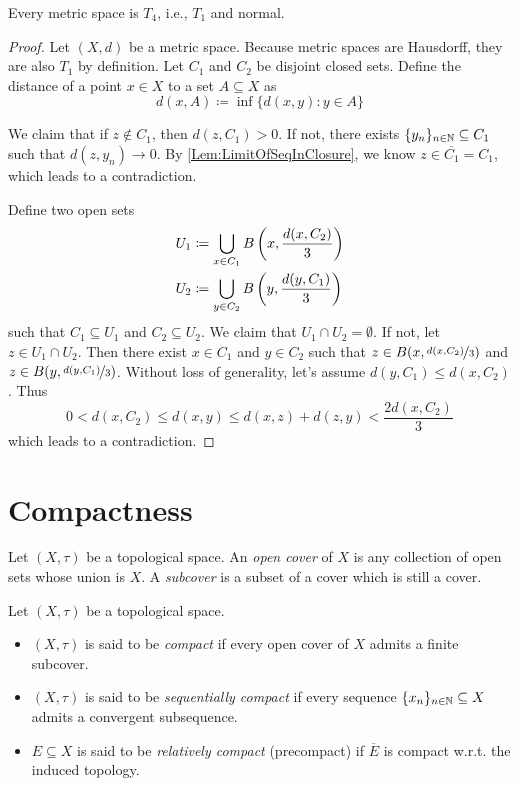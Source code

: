 \documentclass[screen]{techreport}
\numberwithin{equation}{section}
\begin{document}
\begin{proposition}\label{Prop:MetricT4}
	Every metric space is $T_4$, i.e., $T_1$ and normal.
\end{proposition}
\begin{proof}
	Let $(X,d)$ be a metric space.
	Because metric spaces are Hausdorff, they are also $T_1$ by definition.
	Let $C_1$ and $C_2$ be disjoint closed sets.
	Define the distance of a point $x \in X$ to a set $A \subseteq X$ as
	\[
	d(x,A) \coloneqq \inf \{ d(x,y) : y \in A \}
	\]
	
	We claim that if $z \not\in C_1$, then $d(z,C_1) > 0$.
	If not, there exists $\{y_n\}_{n \in \mathbb{N}} \subseteq C_1$ such that $d(z,y_n) \rightarrow 0$.
	By \cref{Lem:LimitOfSeqInClosure}, we know $z \in \overline{C_1} = C_1$, which leads to a contradiction.
	
	Define two open sets
	\begin{align*}
		U_1 & \coloneqq \bigcup_{x \in C_1} B\left({x,\frac{d(x,C_2)}{3}}\right) \\
		U_2 & \coloneqq \bigcup_{y \in C_2} B\left({y,\frac{d(y,C_1)}{3}}\right)
	\end{align*}
	such that $C_1 \subseteq U_1$ and $C_2 \subseteq U_2$.
	We claim that $U_1 \cap U_2 = \emptyset$.
	If not, let $z \in U_1 \cap U_2$.
	Then there exist $x \in C_1$ and $y \in C_2$ such that $z \in B(x,\nicefrac{d(x,C_2)}{3})$ and $z \in B(y,\nicefrac{d(y,C_1)}{3})$.
	Without loss of generality, let's assume $d(y,C_1) \le d(x,C_2)$.
	Thus
	\[
	0 < d(x,C_2) \le d(x,y) \le d(x,z)+d(z,y) < \frac{2d(x,C_2)}{3}
	\]
	which leads to a contradiction.
\end{proof}

\section{Compactness}

\begin{definition}\label{De:Covers}
	Let $(X,\tau)$ be a topological space.
	An \emph{open cover} of $X$ is any collection of open sets whose union is $X$.
	A \emph{subcover} is a subset of a cover which is still a cover.
\end{definition}

\begin{definition}\label{De:CompactSpace}
	Let $(X,\tau)$ be a topological space.
	\begin{itemize}
		\item $(X,\tau)$ is said to be \emph{compact} if every open cover of $X$ admits a finite subcover.
		\item $(X,\tau)$ is said to be \emph{sequentially compact} if every sequence $\{x_n\}_{n \in \mathbb{N}} \subseteq X$ admits a convergent subsequence.
		\item $E \subseteq X$ is said to be \emph{relatively compact} (precompact) if $\overline{E}$ is compact w.r.t. the induced topology.
	\end{itemize}
\end{definition}
\end{document}
